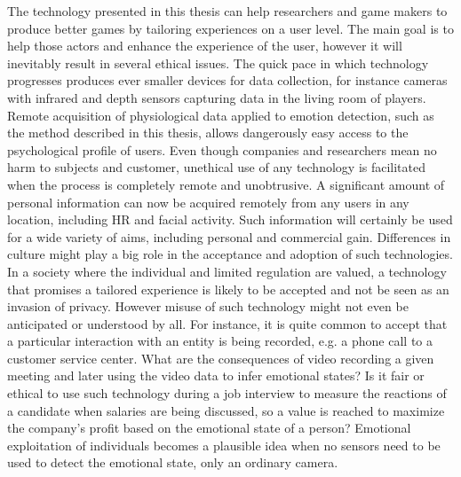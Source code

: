 The technology presented in this thesis can help researchers and game makers to produce better games by tailoring experiences on a user level. The main goal is to help those actors and enhance the experience of the user, however it will inevitably result in several ethical issues. The quick pace in which technology progresses produces ever smaller devices for data collection, for instance cameras with infrared and depth sensors capturing data in the living room of players. Remote acquisition of physiological data applied to emotion detection, such as the method described in this thesis, allows dangerously easy access to the psychological profile of users. Even though companies and researchers mean no harm to subjects and customer, unethical use of any technology is facilitated when the process is completely remote and unobtrusive. A significant amount of personal information can now be acquired remotely from any users in any location, including HR and facial activity. Such information will certainly be used for a wide variety of aims, including personal and commercial gain. Differences in culture might play a big role in the acceptance and adoption of such technologies. In a society where the individual and limited regulation are valued, a technology that promises a tailored experience is likely to be accepted and not be seen as an invasion of privacy. However misuse of such technology might not even be anticipated or understood by all. For instance, it is quite common to accept that a particular interaction with an entity is being recorded, e.g. a phone call to a customer service center. What are the consequences of video recording a given meeting and later using the video data to infer emotional states? Is it fair or ethical to use such technology during a job interview to measure the reactions of a candidate when salaries are being discussed, so a value is reached to maximize the company's profit based on the emotional state of a person? Emotional exploitation of individuals becomes a plausible idea when no sensors need to be used to detect the emotional state, only an ordinary camera.

